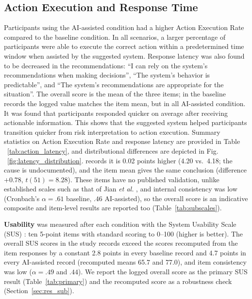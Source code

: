 \documentclass[journal]{IEEEtran}
\theoremstyle{plain}
\theoremstyle{definition}
\providecommand{\DIFaddtex}[1]{{\protect\color{blue} \sf #1}} %
\providecommand{\DIFdeltex}[1]{{\protect\color{red} \scriptsize #1}} %
\providecommand{\DIFaddbegin}{} %
\providecommand{\DIFaddend}{} %
\providecommand{\DIFdelbegin}{} %
\providecommand{\DIFdelend}{} %
\providecommand{\DIFadd}[1]{\texorpdfstring{\DIFaddtex{#1}}{#1}} %
\providecommand{\DIFdel}[1]{\texorpdfstring{\DIFdeltex{#1}}{}} %
\newcommand{\DIFscaledelfig}{0.5}
\newlength{\DIFdelgraphicswidth} %
\newlength{\DIFdelgraphicsheight} %
\newcommand{\DIFaddincludegraphics}[2][]{{\color{blue}\fbox{\DIFOincludegraphics[#1]{#2}}}} %
\newcommand{\DIFdelincludegraphics}[2][]{%
\sbox{\DIFdelgraphicsbox}{\DIFOincludegraphics[#1]{#2}}%
\settoboxwidth{\DIFdelgraphicswidth}{\DIFdelgraphicsbox} %
\settoboxtotalheight{\DIFdelgraphicsheight}{\DIFdelgraphicsbox} %
\scalebox{\DIFscaledelfig}{%
\parbox[b]{\DIFdelgraphicswidth}{\usebox{\DIFdelgraphicsbox}\\[-\baselineskip] \rule{\DIFdelgraphicswidth}{0em}}\llap{\resizebox{\DIFdelgraphicswidth}{\DIFdelgraphicsheight}{%
\setlength{\unitlength}{\DIFdelgraphicswidth}%
\begin{picture}(1,1)%
\thicklines\linethickness{2pt} %
{\color[rgb]{1,0,0}\put(0,0){\framebox(1,1){}}}%
{\color[rgb]{1,0,0}\put(0,0){\line( 1,1){1}}}%
{\color[rgb]{1,0,0}\put(0,1){\line(1,-1){1}}}%
\end{picture}%
}\hspace*{3pt}}} %
} %
\DeclareRobustCommand{\DIFaddbegin}{\DIFOaddbegin \let\includegraphics\DIFaddincludegraphics} %
\DeclareRobustCommand{\DIFaddend}{\DIFOaddend \let\includegraphics\DIFOincludegraphics} %
\DeclareRobustCommand{\DIFdelbegin}{\DIFOdelbegin \let\includegraphics\DIFdelincludegraphics} %
\DeclareRobustCommand{\DIFdelend}{\DIFOaddend \let\includegraphics\DIFOincludegraphics} %
\begin{document}
\subsection{\DIFdel{Action Execution and Response Time}}
\addtocounter{subsection}{-1}%
\DIFdel{Participants using the AI-assisted condition had a higher Action Execution Rate compared to the baseline condition. In all scenarios, a larger percentage of participants were able to execute the correct action within a predetermined time window when assisted by the suggested system. Response latency was also found to be decreased in the }\DIFdelend \DIFaddbegin \DIFadd{recommendations: ``I can rely on the system's recommendations when making decisions'', ``The system's behavior is predictable'', and ``The system's recommendations are appropriate for the situation''. The overall score is the mean of the three items; in the baseline records the logged value matches the item mean, but in all }\DIFaddend AI-assisted \DIFdelbegin \DIFdel{condition. It was found that participants responded quicker on average after receiving actionable information. This shows that the suggested system helped participants transition quicker from risk interpretation to action execution. Summary statistics on Action Execution Rate and response latency are provided in Table ~\ref{tab:action_latency}, and distributional differences are depicted in Fig. ~\ref{fig:latency_distribution}. }\DIFdelend \DIFaddbegin \DIFadd{records it is 0.02 points higher (4.20 vs.\ 4.18; the cause is undocumented), and the item mean gives the same conclusion (difference $+0.78$, $t(51)=8.28$). These items have no published validation, unlike established scales such as that of Jian \emph{et al.} \cite{Jian2000}, and internal consistency was low (Cronbach's $\alpha = .61$ baseline, $.46$ AI-assisted), so the overall score is an indicative composite and item-level results are reported too (Table~\ref{tab:subscales}).
}\DIFaddend 

    \DIFdelbegin %
\DIFdelend \DIFaddbegin \DIFadd{\textbf{Usability} was measured after each condition with the System Usability Scale (SUS) \cite{Brooke1996}: ten 5-point items with standard scoring to 0--100 (higher is better). The overall SUS scores in the study records exceed the scores recomputed from the item responses by a constant 2.8 points in every baseline record and 4.7 points in every AI-assisted record (recomputed means 65.7 and 77.0), and item consistency was low ($\alpha = .49$ and $.44$). We report the logged overall score as the primary SUS result (Table~\ref{tab:primary}) and the recomputed score as a robustness check (Section~\ref{sec:res_sub}).
}\DIFaddend 
\end{document}
